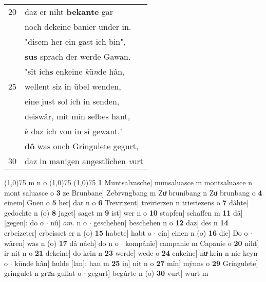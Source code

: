 \documentclass[8pt,a4paper,notitlepage]{article}
\begin{document}
\begin{table}[ht]
\begin{minipage}[t]{0.5\linewidth}
\begin{tabular}{rl}
20 & daz er niht \textbf{bekante} gar\\ 
 & noch dekeine banier under in.\\ 
 & "disem her ein gast ich bin",\\ 
 & \textbf{sus} sprach der werde Gawan.\\ 
 & "sît ich\textbf{s} enkeine \textit{k}ü\textit{n}de hân,\\ 
25 & wellent siz in übel wenden,\\ 
 & eine just sol ich in senden,\\ 
 & deiswâr, mit mîn selbes hant,\\ 
 & ê daz ich von in sî gewant."\\ 
 & \textbf{dô} was ouch Gringulete gegurt,\\ 
30 & daz in manigen angestlîchen \textit{v}urt\\ 
\end{tabular}
\scriptsize
\line(1,0){75} \newline
m n o \newline
\line(1,0){75} \newline
\newline
\line(1,0){75} \newline
\textbf{1} Muntsalvasche] munsaluasce m montsaluasce n mont saluasce o \textbf{3} ze Brunbane] Zebrvngbang m Zuͯ brunibang n Zuͦ brunbang o \textbf{4} einem] Gnen o \textbf{5} her] dar n o \textbf{6} Trevrizent] treirierzen n trieriezens o \textbf{7} dâhte] gedochte n (o) \textbf{8} jaget] saget m \textbf{9} ist] wer n o \textbf{10} stapfen] schaffen m \textbf{11} dâ] [gegen]: do o  $\cdot$ nû] \textit{om.} n o  $\cdot$ geschehen] beschehen n o \textbf{12} daz] des n \textbf{14} erbeizeter] erbeisset er n (o) \textbf{15} habete] habt o  $\cdot$ ein] einen n (o) \textbf{16} die] Do o  $\cdot$ wâren] was n (o) \textbf{17} dâ nâch] do n o  $\cdot$ kompânîe] campanie m Capanie o \textbf{20} niht] ir nit n o \textbf{21} dekeine] do kein n \textbf{23} werde] wede o \textbf{24} enkeine] nuͯ kein n nie keyn o  $\cdot$ künde hân] hulde [lan]: han m \textbf{25} in] nit n o \textbf{27} mîn] mẏnns o \textbf{29} Gringulete] gringulet n gruͯn gullat o  $\cdot$ gegurt] begúrte n (o) \textbf{30} vurt] wurt m \newline
\end{minipage}
\end{table}
\newpage
\end{document}
